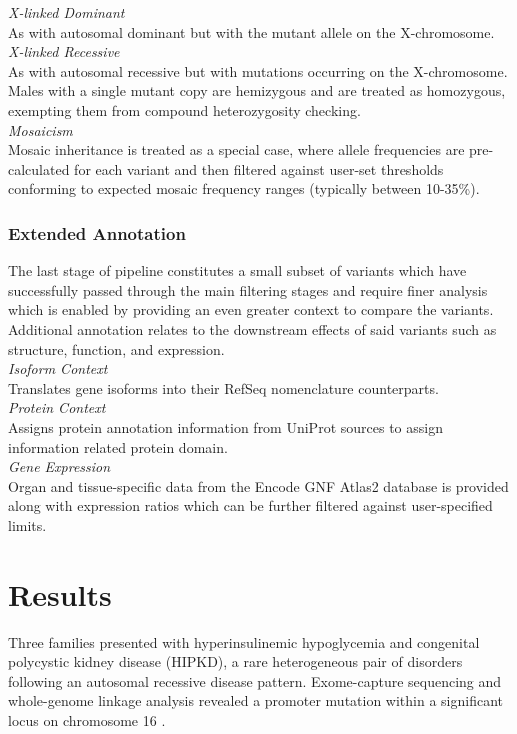 \documentclass[twocolumn]{bmcart}%
\newcommand{\triplesub}[2]{\noindent\textsl{#1}\\#2\\}  %
\begin{document}
\triplesub{X-linked Dominant}{As with autosomal dominant but with the mutant allele on the X-chromosome.}

\triplesub{X-linked Recessive}{
As with autosomal recessive but with mutations occurring on the X-chromosome. Males with a single mutant copy are hemizygous and are treated as homozygous, exempting them from compound heterozygosity checking.}


\triplesub{Mosaicism}{Mosaic inheritance is treated as a special case, where allele frequencies are pre-calculated for each variant and then filtered against user-set thresholds conforming to expected mosaic frequency ranges (typically between 10-35\%).}




\subsubsection{Extended Annotation}

The last stage of pipeline constitutes a small subset of variants which have successfully passed through the main filtering stages and require finer analysis which is enabled by providing an even greater context to compare the variants. Additional annotation relates to the downstream effects of said variants such as structure, function, and expression.\\


\triplesub{Isoform Context}{Translates gene isoforms into their RefSeq nomenclature counterparts.}

\triplesub{Protein Context}{Assigns protein annotation information from UniProt sources to assign information related protein domain.}

\triplesub{Gene Expression}{Organ and tissue-specific data from the Encode GNF Atlas2 database is provided along with expression ratios which can be further filtered against user-specified limits.}


\section*{Results}


Three families presented with hyperinsulinemic hypoglycemia and congenital polycystic kidney disease (HIPKD), a rare heterogeneous pair of disorders following an autosomal recessive disease pattern. Exome-capture sequencing and whole-genome linkage analysis revealed a promoter mutation within a significant locus on chromosome 16 \cite{cabezas2017polycystic}.
\end{document}
